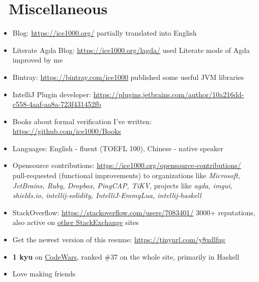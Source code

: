 \documentclass{resume}
\begin{document}

\section{\faInfo\ Miscellaneous}
\begin{itemize}[parsep=0.25ex]
  \item Blog: \url{https://ice1000.org/} partially translated into English
  \item Literate Agda Blog: \url{https://ice1000.org/lagda/} used Literate mode of Agda improved by me
  \item Bintray: \url{https://bintray.com/ice1000} published some useful JVM libraries
  \item IntelliJ Plugin developer: \url{https://plugins.jetbrains.com/author/10a216dd-c558-4aaf-aa8a-723f431452fb}
  \item Books about formal verification I've written: \url{https://github.com/ice1000/Books}
  \item Languages: English - fluent (TOEFL 100), Chinese - native speaker
  \item Opensource contributions: \url{https://ice1000.org/opensource-contributions/} \\
    pull-requested (functional improvements) to organizations like \textit{Microsoft, JetBrains, Ruby, Dropbox, PingCAP, TiKV},
    projects like \textit{agda, imgui, shields.io, intellij-solidity, IntelliJ-EmmyLua, intellij-haskell}
  \item StackOverflow: \url{https://stackoverflow.com/users/7083401/}
    3000+ reputations, also active on \href{https://stackexchange.com/users/9532102/} {other StackExchange} sites
  \item Get the newest version of this resume: \url{https://tinyurl.com/y8xdlfug}
  \item \textbf{1 kyu} on
    \href{https://www.codewars.com/users/ice1000} {CodeWars},
    ranked \#37 on the whole site, primarily in Haskell
  \item Love making friends
\end{itemize}

%
%
\end{document}

